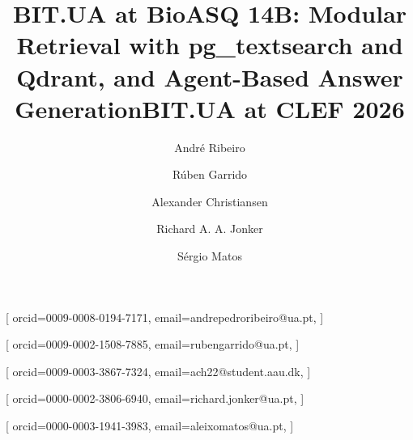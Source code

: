 \documentclass[
]{ceurart}
\begin{document}


\title{BIT.UA at BioASQ 14B: Modular Retrieval with pg\_textsearch and Qdrant, and Agent-Based Answer Generation}

\title[mode=sub]{BIT.UA at CLEF 2026}

\author[2]{André Ribeiro}[%
  orcid=0009-0008-0194-7171,
  email=andrepedroribeiro@ua.pt,
]
\cormark[1]

\author[1]{Rúben Garrido}[%
  orcid=0009-0002-1508-7885,
  email=rubengarrido@ua.pt,
]
\cormark[1]

\author[3]{Alexander Christiansen}[%
  orcid=0009-0003-3867-7324,
  email=ach22@student.aau.dk,
]

\author[1,3]{Richard A. A. Jonker}[%
  orcid=0000-0002-3806-6940,
  email=richard.jonker@ua.pt,
]


\author[1]{Sérgio Matos}[%
  orcid=0000-0003-1941-3983,
  email=aleixomatos@ua.pt,
]

\address[1]{IEETA/DETI, LASI, University of Aveiro, Aveiro, Portugal}
\address[2]{IT, University of Aveiro, Aveiro, Portugal}
\address[3]{Aalborg University Business School, Aalborg, Denmark}

\end{document}
